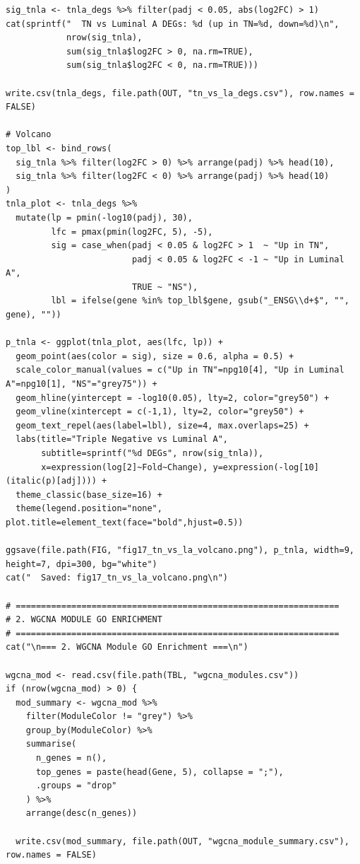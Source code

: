 \documentclass[12pt,a4paper]{ctexart}
\begin{document}
\begin{lstlisting}[caption={20_deep_analysis}, basicstyle=\ttfamily\scriptsize]
sig_tnla <- tnla_degs %>% filter(padj < 0.05, abs(log2FC) > 1)
cat(sprintf("  TN vs Luminal A DEGs: %d (up in TN=%d, down=%d)\n",
            nrow(sig_tnla),
            sum(sig_tnla$log2FC > 0, na.rm=TRUE),
            sum(sig_tnla$log2FC < 0, na.rm=TRUE)))

write.csv(tnla_degs, file.path(OUT, "tn_vs_la_degs.csv"), row.names = FALSE)

# Volcano
top_lbl <- bind_rows(
  sig_tnla %>% filter(log2FC > 0) %>% arrange(padj) %>% head(10),
  sig_tnla %>% filter(log2FC < 0) %>% arrange(padj) %>% head(10)
)
tnla_plot <- tnla_degs %>%
  mutate(lp = pmin(-log10(padj), 30),
         lfc = pmax(pmin(log2FC, 5), -5),
         sig = case_when(padj < 0.05 & log2FC > 1  ~ "Up in TN",
                         padj < 0.05 & log2FC < -1 ~ "Up in Luminal A",
                         TRUE ~ "NS"),
         lbl = ifelse(gene %in% top_lbl$gene, gsub("_ENSG\\d+$", "", gene), ""))

p_tnla <- ggplot(tnla_plot, aes(lfc, lp)) +
  geom_point(aes(color = sig), size = 0.6, alpha = 0.5) +
  scale_color_manual(values = c("Up in TN"=npg10[4], "Up in Luminal A"=npg10[1], "NS"="grey75")) +
  geom_hline(yintercept = -log10(0.05), lty=2, color="grey50") +
  geom_vline(xintercept = c(-1,1), lty=2, color="grey50") +
  geom_text_repel(aes(label=lbl), size=4, max.overlaps=25) +
  labs(title="Triple Negative vs Luminal A",
       subtitle=sprintf("%d DEGs", nrow(sig_tnla)),
       x=expression(log[2]~Fold~Change), y=expression(-log[10](italic(p)[adj]))) +
  theme_classic(base_size=16) +
  theme(legend.position="none", plot.title=element_text(face="bold",hjust=0.5))

ggsave(file.path(FIG, "fig17_tn_vs_la_volcano.png"), p_tnla, width=9, height=7, dpi=300, bg="white")
cat("  Saved: fig17_tn_vs_la_volcano.png\n")

# ================================================================
# 2. WGCNA MODULE GO ENRICHMENT
# ================================================================
cat("\n=== 2. WGCNA Module GO Enrichment ===\n")

wgcna_mod <- read.csv(file.path(TBL, "wgcna_modules.csv"))
if (nrow(wgcna_mod) > 0) {
  mod_summary <- wgcna_mod %>%
    filter(ModuleColor != "grey") %>%
    group_by(ModuleColor) %>%
    summarise(
      n_genes = n(),
      top_genes = paste(head(Gene, 5), collapse = ";"),
      .groups = "drop"
    ) %>%
    arrange(desc(n_genes))

  write.csv(mod_summary, file.path(OUT, "wgcna_module_summary.csv"), row.names = FALSE)


\end{lstlisting}
\end{document}
